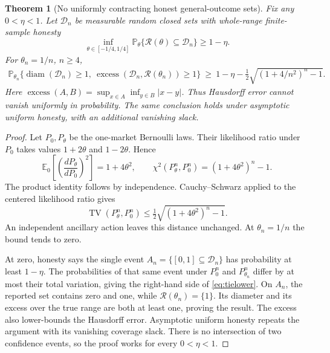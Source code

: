 \documentclass[11pt,a4paper]{article}
\numberwithin{equation}{section}
\newtheorem{theorem}{Theorem}
\theoremstyle{definition}
\newcommand{\E}{\mathbb E}
\newcommand{\Prob}{\mathbb P}
\DeclareMathOperator{\diam}{diam}
\DeclareMathOperator{\excess}{excess}
\DeclareMathOperator{\TV}{TV}
\begin{document}
\begin{theorem}[No uniformly contracting honest general-outcome sets]
\label{thm:impossibility}
Fix any \(0<\eta<1\). Let \(\mathcal D_n\) be measurable random
closed sets with whole-range finite-sample honesty
\begin{equation}\label{eq:honesttie}
 \inf_{\theta\in[-1/4,1/4]}
   \Prob_\theta\{\mathcal R(\theta)\subseteq\mathcal D_n\}
                         \ge1-\eta.
\end{equation}
For \(\theta_n=1/n\), \(n\ge4\),
\begin{equation}\label{eq:tielower}
 \begin{split}
 \Prob_{\theta_n}\{\diam(\mathcal D_n)\ge1,\
     \excess(\mathcal D_n,\mathcal R(\theta_n))\ge1\}
 \ \ge\ 1-\eta-\tfrac12\sqrt{(1+4/n^2)^n-1}.
 \end{split}
\end{equation}
Here
\(\excess(A,B)=\sup_{x\in A}\inf_{y\in B}|x-y|\).
Thus Hausdorff error cannot vanish uniformly in probability.
The same conclusion holds under asymptotic uniform honesty, with
an additional vanishing slack.
\end{theorem}
\begin{proof}
Let \(P_0,P_\theta\) be the one-market Bernoulli laws.
Their likelihood ratio under \(P_0\) takes values
\(1+2\theta\) and \(1-2\theta\). Hence
\[
 \E_0\left[\left(\frac{dP_\theta}{dP_0}\right)^2\right]
      =1+4\theta^2,\qquad
 \chi^2(P_\theta^n,P_0^n)=(1+4\theta^2)^n-1.
\]
The product identity follows by independence. Cauchy--Schwarz
applied to the centered likelihood ratio gives
\[
 \TV(P_\theta^n,P_0^n)
          \le\tfrac12\sqrt{(1+4\theta^2)^n-1}.
\]
An independent ancillary action leaves this distance unchanged.
At \(\theta_n=1/n\) the bound tends to zero.

At zero, honesty says the single event
\(A_n=\{[0,1]\subseteq\mathcal D_n\}\) has probability
at least \(1-\eta\).
The probabilities of that same event under \(P_0^n\) and
\(P_{\theta_n}^n\) differ by at most their total variation,
giving the right-hand side of \eqref{eq:tielower}.
On \(A_n\), the reported set contains zero and one, while
\(\mathcal R(\theta_n)=\{1\}\). Its diameter and its excess
over the true range are both at least one, proving the result.
The excess also lower-bounds the Hausdorff error.
Asymptotic uniform honesty repeats the argument with its vanishing
coverage slack. There is no intersection of two confidence events,
so the proof works for every \(0<\eta<1\).
\end{proof}
\end{document}
